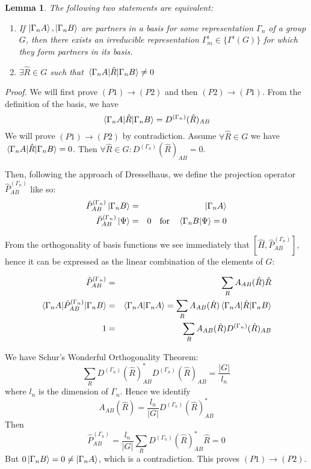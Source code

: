 \documentclass[12pt]{article}
\newtheorem{basis_mixing}
{Lemma}
\begin{document}
	\begin{basis_mixing}
	The following two statements are equivalent:
	\begin{enumerate}[label=(P\arabic*)]
	\item If $\ket{\Gamma_nA}, \ket{\Gamma_nB}$ are partners in a basis for \textit{some} representation $\Gamma_n$ of a group $G$, then there exists an irreducible representation $\Gamma_m^i\in \{\Gamma^i(G)\}$ for which they form partners in its basis.
	\item $\exists \hat{R}\in G$ such that $\mel{\Gamma_nA}{\hat{R}}{\Gamma_nB}\neq 0$
	\end{enumerate}
	\end{basis_mixing}
	
	\textit{Proof.} We will first prove $(P1)\rightarrow (P2)$ and then $(P2)\rightarrow (P1)$. From the definition of the basis, we have
	$$\mel{\Gamma_nA}{\hat{R}}{\Gamma_nB} = D^{\left(\Gamma_n\right)}(\hat{R})_{AB}$$
	We will prove $(P1)\rightarrow (P2)$ by contradiction. Assume $\forall \hat{R}\in G$ we have $\mel{\Gamma_nA}{\hat{R}}{\Gamma_nB}=0$. Then $\forall \hat{R}\in G: D^{\left(\Gamma_n\right)}(\hat{R})_{AB}=0$.
	
	Then, following the approach of Dresselhaus, we define the projection operator $\hat{P}^{\left(\Gamma_n\right)}_{AB}$ like so:
	\begin{eqnarray*}		
	\hat{P}^{\left(\Gamma_n\right)}_{AB}\ket{\Gamma_nB}&=&\ket{\Gamma_nA}\\
	\hat{P}^{\left(\Gamma_n\right)}_{AB}\ket{\Psi}&=&0 \qq{for} \braket{\Gamma_n B}{\Psi}=0
	\end{eqnarray*}
	
	From the orthogonality of basis functions we see immediately that $[\hat{H},\hat{P}^{\left(\Gamma_n\right)}_{AB}]$, hence it can be expressed as the linear combination of the elements of $G$:
	
	\begin{eqnarray*}
	\hat{P}^{\left(\Gamma_n\right)}_{AB}&=&\sum_{R}A_{AB}(\hat{R})\hat{R}\\
	\mel{\Gamma_nA}{\hat{P}^{\left(\Gamma_n\right)}_{AB}}{\Gamma_nB}&=&\braket{\Gamma_nA}{\Gamma_nA}=\sum_{R}A_{AB}(\hat{R})\mel{\Gamma_nA}{\hat{R}}{\Gamma_nB}\\
	1&=&\sum_{R}A_{AB}(\hat{R})D^{\left(\Gamma_n\right)}(\hat{R})_{AB}
	\end{eqnarray*}
	
	We have Schur's Wonderful Orthogonality Theorem:
	$$\sum_{R}D^{\left(\Gamma_n\right)}(\hat{R})_{AB}^* D^{\left(\Gamma_n\right)}(\hat{R})_{AB} = \frac{|G|}{l_n}$$
	where $l_n$ is the dimension of $\Gamma_n$. Hence we identify
	$$A_{AB}(\hat{R})=\frac{l_n}{|G|}D^{\left(\Gamma_n\right)}(\hat{R})_{AB}^*$$
	Then
	$$\hat{P}^{\left(\Gamma_n\right)}_{AB}=\frac{l_n}{|G|}\sum_{R}D^{\left(\Gamma_n\right)}(\hat{R})_{AB}^*\hat{R}=0$$
	But $0\ket{\Gamma_nB}=0\neq\ket{\Gamma_nA}$, which is a contradiction. This proves $(P1)\rightarrow (P2)$.
	
\end{document}
